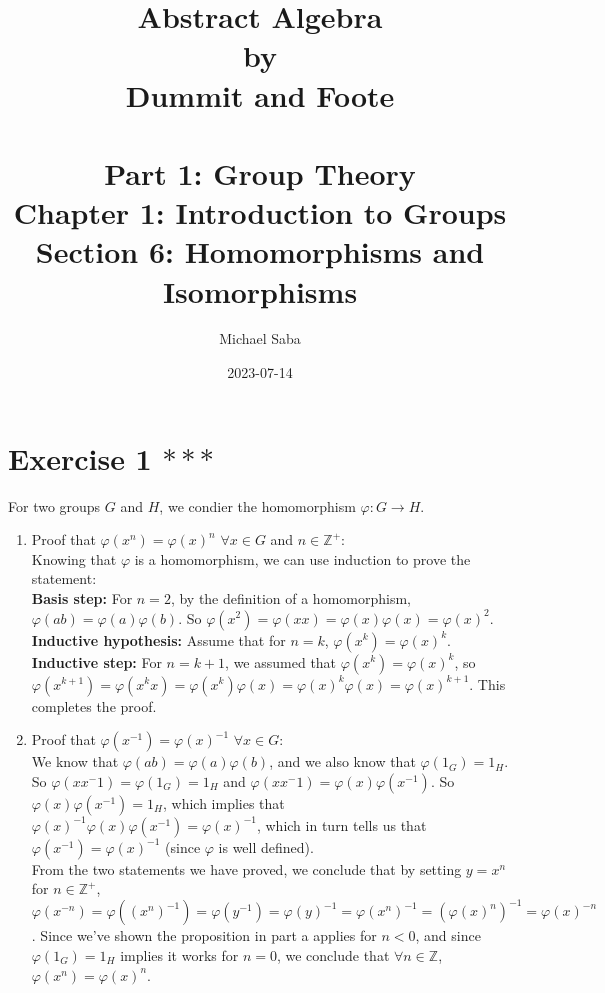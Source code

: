 \documentclass{article}
\title{%
    \Huge Abstract Algebra \\
    \large by \\
    \Large Dummit and Foote \\~\\
    \huge Part 1: Group Theory \\
    \LARGE Chapter 1: Introduction to Groups \\
    \Large Section 6: Homomorphisms and Isomorphisms
}
\date{2023-07-14}
\author{Michael Saba}
\newcommand{\Z}{\mathbb{Z}}
\begin{document}
    \maketitle
    \newpage


    \section*{Exercise 1 $***$}
    For two groups $G$ and $H$,
    we condier the homomorphism $\varphi: G \to H$. \\ 
    \begin{enumerate}[label=\textbf{\alph*.}]
        \item 
            Proof that $\varphi(x^n) = \varphi(x)^n$ $\forall x \in G$
            and $n \in \Z^+$: \\
            Knowing that $\varphi$ is a homomorphism,
            we can use induction to prove the statement: \\
            \textbf{Basis step:}
            For $n = 2$,
            by the definition of a homomorphism,
            $\varphi(ab) = \varphi(a)\varphi(b)$.
            So $\varphi(x^2) = \varphi(xx)
            = \varphi(x)\varphi(x)
            = \varphi(x)^2$. \\
            \textbf{Inductive hypothesis:}
            Assume that for $n = k$, $\varphi(x^k) = \varphi(x)^k$. \\ 
            \textbf{Inductive step:}
            For $n = k+1$,
            we assumed that $\varphi(x^k) = \varphi(x)^k$,
            so $\varphi(x^{k+1}) = \varphi(x^kx)
            = \varphi(x^k)\varphi(x)
            = \varphi(x)^k\varphi(x)
            = \varphi(x)^{k+1}$.
            This completes the proof.
        \item
            Proof that $\varphi(x^{-1}) = \varphi(x)^{-1}$
            $\forall x \in G$: \\
            We know that $\varphi(ab) = \varphi(a)\varphi(b)$,
            and we also know that $\varphi(1_G) = 1_H$.
            So $\varphi(xx^-1) = \varphi(1_G) = 1_H$
            and $\varphi(xx^-1) = \varphi(x)\varphi(x^{-1})$.
            So $\varphi(x)\varphi(x^{-1}) = 1_H$,
            which implies that
            $\varphi(x)^{-1}\varphi(x)\varphi(x^{-1}) = \varphi(x)^{-1}$,
            which in turn tells us that
            $\varphi(x^{-1}) = \varphi(x)^{-1}$
            (since $\varphi$ is well defined). \\
            From the two statements we have proved,
            we conclude that by setting $y = x^n$ for $n \in \Z^+$,
            $ \varphi(x^{-n}) = \varphi((x^n)^{-1})
            = \varphi(y^{-1})
            = \varphi(y)^{-1}
            = \varphi(x^n)^{-1}
            = (\varphi(x)^n)^{-1}
            = \varphi(x)^{-n}$.
            Since we've shown the proposition in part a applies for $n < 0$,
            and since $\varphi(1_G) = 1_H$ implies it works for
            $n = 0$, we conclude that $\forall n \in \Z$, 
            $\varphi(x^n) = \varphi(x)^n$.
    \end{enumerate}
\end{document}
